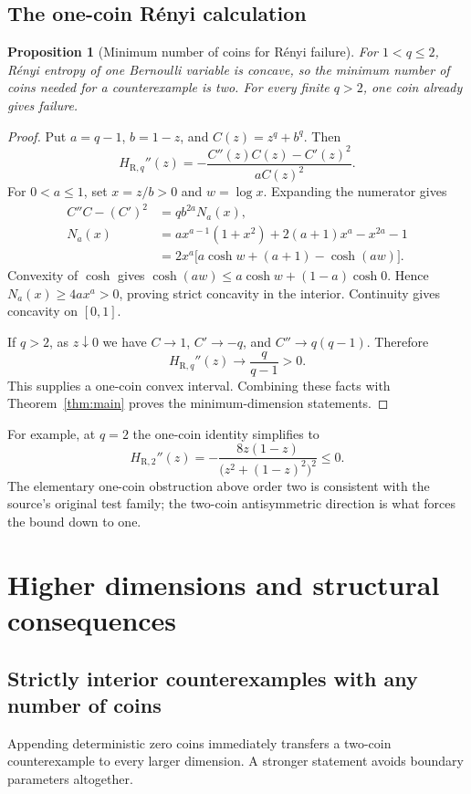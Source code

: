 \documentclass[11pt]{article}
\numberwithin{equation}{section}
\newtheorem{proposition}[theorem]{Proposition}
\theoremstyle{definition}
\theoremstyle{remark}
\begin{document}
\subsection{The one-coin R\'enyi calculation}
\begin{proposition}[Minimum number of coins for R\'enyi failure]
\label{prop:minimalrenyi}
For $1<q\leq2$, R\'enyi entropy of one Bernoulli variable is concave, so the
minimum number of coins needed for a counterexample is two. For every
finite $q>2$, one coin already gives failure.
\end{proposition}
\begin{proof}
Put $a=q-1$, $b=1-z$, and $C(z)=z^q+b^q$. Then
\[
 H_{\mathrm R,q}''(z)
 =-\frac{C''(z)C(z)-C'(z)^2}{aC(z)^2}.
\]
For $0<a\leq1$, set $x=z/b>0$ and $w=\log x$. Expanding the numerator gives
\begin{align}
 C''C-(C')^2
 &=q b^{2a}N_a(x),\\
 N_a(x)&=a x^{a-1}(1+x^2)+2(a+1)x^a-x^{2a}-1\\
 &=2x^a\bigl[a\cosh w+(a+1)-\cosh(aw)\bigr].
\end{align}
Convexity of $\cosh$ gives
$\cosh(aw)\leq a\cosh w+(1-a)\cosh0$.
Hence $N_a(x)\geq4a x^a>0$, proving strict concavity in the interior.
Continuity gives concavity on $[0,1]$.

If $q>2$, as $z\downarrow0$ we have
$C\to1$, $C'\to-q$, and $C''\to q(q-1)$. Therefore
\[
 H_{\mathrm R,q}''(z)\longrightarrow\frac q{q-1}>0.
\]
This supplies a one-coin convex interval. Combining these facts with
Theorem~\ref{thm:main} proves the minimum-dimension statements.
\end{proof}

For example, at $q=2$ the one-coin identity simplifies to
\[
 H_{\mathrm R,2}''(z)
 =-\frac{8z(1-z)}{\bigl(z^2+(1-z)^2\bigr)^2}\leq0.
\]
The elementary one-coin obstruction above order two is consistent with the
source's original test family; the two-coin antisymmetric direction is what
forces the bound down to one.

\section{Higher dimensions and structural consequences}
\subsection{Strictly interior counterexamples with any number of coins}
Appending deterministic zero coins immediately transfers a two-coin
counterexample to every larger dimension. A stronger statement avoids
boundary parameters altogether.
\end{document}
